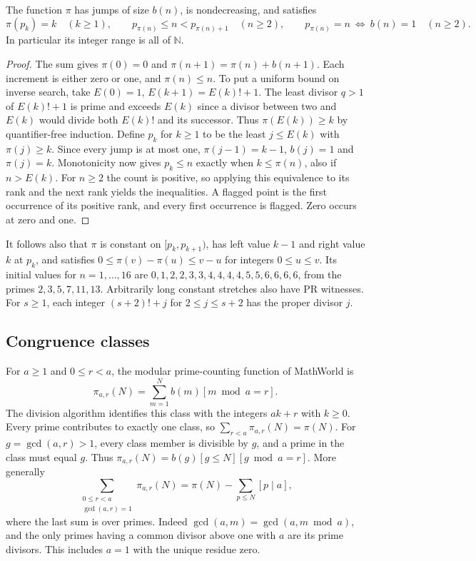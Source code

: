 \begin{theorem}
The function $\pi$ has jumps of size $b(n)$, is nondecreasing, and satisfies
\[
 \pi(p_k)=k\quad(k\ge1),\qquad
 p_{\pi(n)}\le n<p_{\pi(n)+1}\quad(n\ge2),\qquad
 p_{\pi(n)}=n\ \Longleftrightarrow\ b(n)=1\quad(n\ge2).
\]
In particular its integer range is all of $\mathbb N$.
\end{theorem}
\begin{proof}
The sum gives $\pi(0)=0$ and $\pi(n+1)=\pi(n)+b(n+1)$. Each increment is either zero or one, and $\pi(n)\le n$. To put a uniform bound on inverse search, take $E(0)=1$, $E(k+1)=E(k)!+1$. The least divisor $q>1$ of $E(k)!+1$ is prime and exceeds $E(k)$ since a divisor between two and $E(k)$ would divide both $E(k)!$ and its successor. Thus $\pi(E(k))\ge k$ by quantifier-free induction. Define $p_k$ for $k\ge1$ to be the least $j\le E(k)$ with $\pi(j)\ge k$. Since every jump is at most one, $\pi(j-1)=k-1$, $b(j)=1$ and $\pi(j)=k$. Monotonicity now gives $p_k\le n$ exactly when $k\le\pi(n)$, also if $n>E(k)$. For $n\ge2$ the count is positive, so applying this equivalence to its rank and the next rank yields the inequalities. A flagged point is the first occurrence of its positive rank, and every first occurrence is flagged. Zero occurs at zero and one.
\end{proof}

It follows also that $\pi$ is constant on $[p_k,p_{k+1})$, has left value $k-1$ and right value $k$ at $p_k$, and satisfies $0\le\pi(v)-\pi(u)\le v-u$ for integers $0\le u\le v$. Its initial values for $n=1,\ldots,16$ are $0,1,2,2,3,3,4,4,4,4,5,5,6,6,6,6$, from the primes $2,3,5,7,11,13$. Arbitrarily long constant stretches also have PR witnesses. For $s\ge1$, each integer $(s+2)!+j$ for $2\le j\le s+2$ has the proper divisor $j$.

\subsection{Congruence classes}
For $a\ge1$ and $0\le r<a$, the modular prime-counting function of MathWorld is
\[
 \pi_{a,r}(N)=\sum_{m=1}^N b(m)[m\bmod a=r].
\]
The division algorithm identifies this class with the integers $ak+r$ with $k\ge0$. Every prime contributes to exactly one class, so $\sum_{r<a}\pi_{a,r}(N)=\pi(N)$. For $g=\gcd(a,r)>1$, every class member is divisible by $g$, and a prime in the class must equal $g$. Thus $\pi_{a,r}(N)=b(g)[g\le N][g\bmod a=r]$. More generally
\[
 \sum_{\substack{0\le r<a\\\gcd(a,r)=1}}\pi_{a,r}(N)
  =\pi(N)-\sum_{p\le N}[p\mid a],
\]
where the last sum is over primes. Indeed $\gcd(a,m)=\gcd(a,m\bmod a)$, and the only primes having a common divisor above one with $a$ are its prime divisors. This includes $a=1$ with the unique residue zero.
